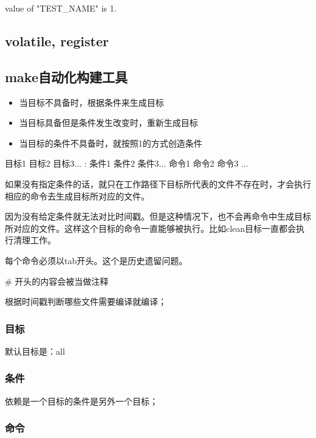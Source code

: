 \begin{Command-Line}[运行结果]
value of "TEST_NAME" is 1.
\end{Command-Line}

\subsection{volatile, register}


\subsection{make自动化构建工具}

\begin{itemize}
\item 当目标不具备时，根据条件来生成目标
\item 当目标具备但是条件发生改变时，重新生成目标
\item 当目标的条件不具备时，就按照1的方式创造条件
\end{itemize}

\begin{Command-Line}
目标1 目标2 目标3... : 条件1 条件2 条件3...
	命令1
	命令2
	命令3
...
\end{Command-Line}

如果没有指定条件的话，就只在工作路径下目标所代表的文件不存在时，才会执行相应的命令去生成目标所对应的文件。

因为没有给定条件就无法对比时间戳。但是这种情况下，也不会再命令中生成目标所对应的文件。这样这个目标的命令一直能够被执行。比如clean目标一直都会执行清理工作。

每个命令必须以tab开头。这个是历史遗留问题。

\# 开头的内容会被当做注释

根据时间戳判断哪些文件需要编译就编译；

\subsubsection{目标}

默认目标是：all

\subsubsection{条件}

依赖是一个目标的条件是另外一个目标；

\subsubsection{命令}

